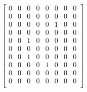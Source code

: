 \documentclass[12pt]{article}
\begin{document}
$ \begin{equation*}    \begin{bmatrix}    0 & 0 & 0 & 0 & 0 & 0 & 0 & 0 \\[0.3em]    0 & 0 & 0 & 0 & 0 & 0 & 0 & 0 \\[0.3em]    0 & 0 & 0 & 0 & 0 & 1 & 0 & 0 \\[0.3em]    0 & 0 & 0 & 0 & 0 & 0 & 0 & 0 \\[0.3em]    0 & 0 & 1 & 0 & 0 & 0 & 0 & 0 \\[0.3em]    0 & 0 & 0 & 0 & 0 & 0 & 0 & 0 \\[0.3em]    0 & 0 & 1 & 0 & 0 & 0 & 0 & 0 \\[0.3em]    0 & 0 & 0 & 0 & 1 & 0 & 0 & 0 \\[0.3em]    0 & 0 & 0 & 0 & 0 & 0 & 0 & 0 \\[0.3em]    0 & 0 & 0 & 0 & 0 & 0 & 0 & 0 \\[0.3em]    \end{bmatrix}    \end{equation*} $
\end{document}

